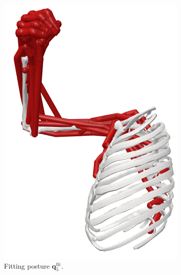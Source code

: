 \begin{figure}[!htb]
\begin{minipage}{0.3\linewidth}
    \end{minipage}
    \hfill
    \begin{minipage}{0.3\linewidth}
        \captionsetup{justification=centering}
        \centering
        \includegraphics[trim={0 0 0 0}, clip, width=0.6\linewidth]{img/chapter_4/pose_3_side.png}
    \end{minipage}
    \caption{Fitting posture $\mathbf{q}_5^{\text{fit}}$.}
    \label{fig:pose_5}
\end{figure}

